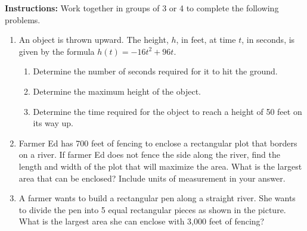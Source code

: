 




\noindent \textbf{Instructions:}  Work together in groups of  3 or 4 to complete the following problems.




\begin{enumerate}

\item An object is thrown upward. The height, $h$, in feet, at time $t$, in seconds, is given by the formula $h(t) = -16t^2 + 96t$. 
\begin{enumerate}
\item Determine the number of seconds required for it to hit the ground. 
\item Determine the maximum height of the object. 
\item Determine the time required for the object to reach a height of 50 feet on its way up.
\end{enumerate}

\vfill
\vfill

\newpage

\item Farmer Ed has 700 feet of fencing to enclose a rectangular plot that borders on a river.  If farmer Ed does not fence the side along the river, find the length and width of the plot that will maximize the area.  What is the largest area that can be enclosed?  Include units of measurement in your answer.

\vfill



\item A farmer wants to build a rectangular pen along a straight river.  She wants to divide the pen into 5 equal rectangular pieces as shown in the picture.  What is the largest area she can enclose with 3,000 feet of fencing?

\begin{center}
\end{center}


\vfill


\end{enumerate}
